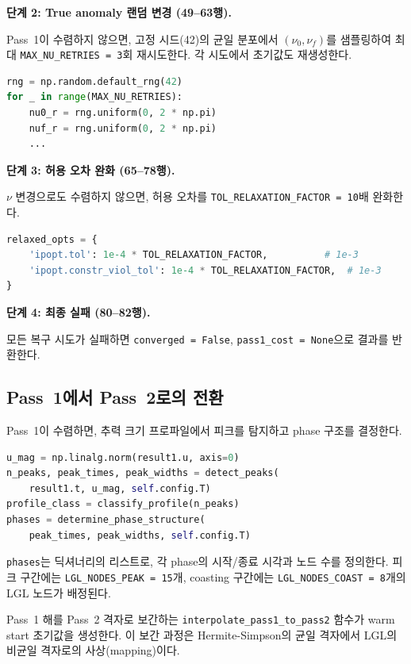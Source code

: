 \documentclass[11pt]{article}
\begin{document}
\textbf{단계 2: True anomaly 랜덤 변경 (49--63행).}

Pass~1이 수렴하지 않으면, 고정 시드(42)의 균일 분포에서 $(\nu_0, \nu_f)$를 샘플링하여 최대 \texttt{MAX\_NU\_RETRIES = 3}회 재시도한다. 각 시도에서 초기값도 재생성한다.

\begin{lstlisting}[language=Python]
rng = np.random.default_rng(42)
for _ in range(MAX_NU_RETRIES):
    nu0_r = rng.uniform(0, 2 * np.pi)
    nuf_r = rng.uniform(0, 2 * np.pi)
    ...
\end{lstlisting}

\textbf{단계 3: 허용 오차 완화 (65--78행).}

$\nu$ 변경으로도 수렴하지 않으면, 허용 오차를 \texttt{TOL\_RELAXATION\_FACTOR = 10}배 완화한다.

\begin{lstlisting}[language=Python]
relaxed_opts = {
    'ipopt.tol': 1e-4 * TOL_RELAXATION_FACTOR,          # 1e-3
    'ipopt.constr_viol_tol': 1e-4 * TOL_RELAXATION_FACTOR,  # 1e-3
}
\end{lstlisting}

\textbf{단계 4: 최종 실패 (80--82행).}

모든 복구 시도가 실패하면 \texttt{converged = False}, \texttt{pass1\_cost = None}으로 결과를 반환한다.

\subsection{Pass~1에서 Pass~2로의 전환}

Pass~1이 수렴하면, 추력 크기 프로파일에서 피크를 탐지하고 phase 구조를 결정한다.

\begin{lstlisting}[language=Python]
u_mag = np.linalg.norm(result1.u, axis=0)
n_peaks, peak_times, peak_widths = detect_peaks(
    result1.t, u_mag, self.config.T)
profile_class = classify_profile(n_peaks)
phases = determine_phase_structure(
    peak_times, peak_widths, self.config.T)
\end{lstlisting}

\texttt{phases}는 딕셔너리의 리스트로, 각 phase의 시작/종료 시각과 노드 수를 정의한다. 피크 구간에는 \texttt{LGL\_NODES\_PEAK = 15}개, coasting 구간에는 \texttt{LGL\_NODES\_COAST = 8}개의 LGL 노드가 배정된다.

Pass~1 해를 Pass~2 격자로 보간하는 \texttt{interpolate\_pass1\_to\_pass2} 함수가 warm start 초기값을 생성한다. 이 보간 과정은 Hermite-Simpson의 균일 격자에서 LGL의 비균일 격자로의 사상(mapping)이다.
\end{document}
